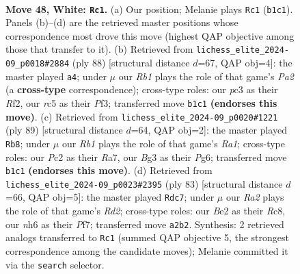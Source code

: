 \documentclass[11pt]{article}
\begin{document}
\clearpage

\begin{figure}[p]\centering
\begin{subfigure}{0.46\textwidth}\centering
\resizebox{\linewidth}{!}{%
\newchessgame
\chessboard[
  setfen={7r/p3b2p/P4k1n/2r5/8/1Pp3BP/R1P1B1P1/1R5K w - - 3 48},
  showmover=false,
  pgfstyle=straightmove, color=movearrow, markmove={b1-c1}
]}
\caption{}
\end{subfigure}\hfill
\begin{subfigure}{0.46\textwidth}\centering
\resizebox{\linewidth}{!}{%
\newchessgame
\chessboard[
  setfen={8/8/1Bp2k2/4p2b/2P2p1p/1PK2P2/P4R1P/6r1 w - - 6 45},
  showmover=false,
  pgfstyle=straightmove, color=movearrow, markmove={a2-a4}
]}
\caption{}
\end{subfigure}
\\[4pt]
\begin{subfigure}{0.46\textwidth}\centering
\resizebox{\linewidth}{!}{%
\newchessgame
\chessboard[
  setfen={r5k1/r4p1p/4p1pP/4P1P1/p3b3/B7/3R2PK/2R5 b - - 12 45},
  showmover=false,
  pgfstyle=straightmove, color=movearrow, markmove={a8-b8}
]}
\caption{}
\end{subfigure}\hfill
\begin{subfigure}{0.46\textwidth}\centering
\resizebox{\linewidth}{!}{%
\newchessgame
\chessboard[
  setfen={2r3k1/3r1pp1/4p2p/1R1p3P/3P1K2/4B3/5PP1/8 b - - 8 42},
  showmover=false,
  pgfstyle=straightmove, color=movearrow, markmove={d7-c7}
]}
\caption{}
\end{subfigure}
\caption{\textbf{Move 48, White: \texttt{Rc1}.} (a) Our position; Melanie plays \texttt{Rc1} (\texttt{b1c1}). Panels (b)--(d) are the retrieved master positions whose correspondence most drove this move (highest QAP objective among those that transfer to it). (b) Retrieved from \texttt{lichess\_elite\_2024-09\_p0018\#2884} (ply 88) [structural distance $d$=67, QAP obj=4]: the master played \texttt{a4}; under $\mu$ our \emph{Rb1} plays the role of that game's \emph{Pa2} (a \textbf{cross-type} correspondence); cross-type roles: our \emph{p}c3 as their \emph{R}f2, our \emph{r}c5 as their \emph{P}f3; transferred move \texttt{b1c1} \textbf{(endorses this move)}. (c) Retrieved from \texttt{lichess\_elite\_2024-09\_p0020\#1221} (ply 89) [structural distance $d$=64, QAP obj=2]: the master played \texttt{Rb8}; under $\mu$ our \emph{Rb1} plays the role of that game's \emph{Ra1}; cross-type roles: our \emph{P}c2 as their \emph{R}a7, our \emph{B}g3 as their \emph{P}g6; transferred move \texttt{b1c1} \textbf{(endorses this move)}. (d) Retrieved from \texttt{lichess\_elite\_2024-09\_p0023\#2395} (ply 83) [structural distance $d$=66, QAP obj=5]: the master played \texttt{Rdc7}; under $\mu$ our \emph{Ra2} plays the role of that game's \emph{Rd2}; cross-type roles: our \emph{B}e2 as their \emph{R}c8, our \emph{n}h6 as their \emph{P}f7; transferred move \texttt{a2b2}. Synthesis: 2 retrieved analogs transferred to \texttt{Rc1} (summed QAP objective 5, the strongest correspondence among the candidate moves); Melanie committed it via the \texttt{search} selector.}
\label{fig:thought-m94}
\end{figure}
\end{document}
